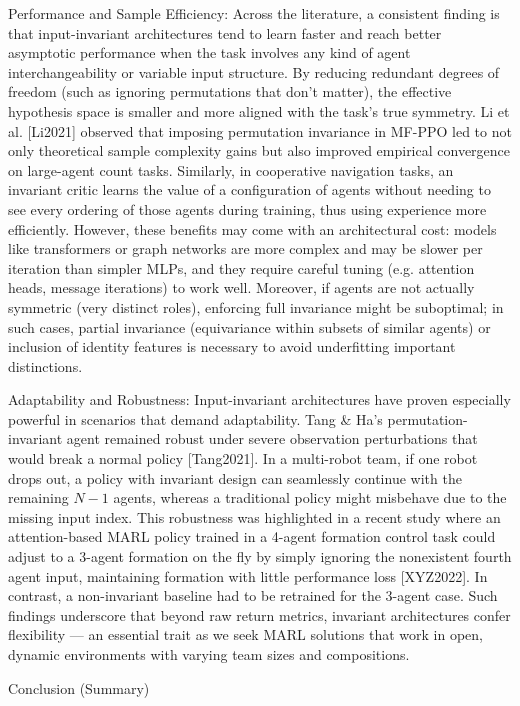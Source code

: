 \documentclass{article}
\begin{document}
Performance and Sample Efficiency: Across the literature, a consistent finding is that input-invariant architectures tend to learn faster and reach better asymptotic performance when the task involves any kind of agent interchangeability or variable input structure. By reducing redundant degrees of freedom (such as ignoring permutations that don’t matter), the effective hypothesis space is smaller and more aligned with the task’s true symmetry. Li et al. [Li2021] observed that imposing permutation invariance in MF-PPO led to not only theoretical sample complexity gains but also improved empirical convergence on large-agent count tasks. Similarly, in cooperative navigation tasks, an invariant critic learns the value of a configuration of agents without needing to see every ordering of those agents during training, thus using experience more efficiently. However, these benefits may come with an architectural cost: models like transformers or graph networks are more complex and may be slower per iteration than simpler MLPs, and they require careful tuning (e.g. attention heads, message iterations) to work well. Moreover, if agents are not actually symmetric (very distinct roles), enforcing full invariance might be suboptimal; in such cases, partial invariance (equivariance within subsets of similar agents) or inclusion of identity features is necessary to avoid underfitting important distinctions.

Adaptability and Robustness: Input-invariant architectures have proven especially powerful in scenarios that demand adaptability. Tang \& Ha's permutation-invariant agent remained robust under severe observation perturbations that would break a normal policy [Tang2021]. In a multi-robot team, if one robot drops out, a policy with invariant design can seamlessly continue with the remaining $N-1$ agents, whereas a traditional policy might misbehave due to the missing input index. This robustness was highlighted in a recent study where an attention-based MARL policy trained in a 4-agent formation control task could adjust to a 3-agent formation on the fly by simply ignoring the nonexistent fourth agent input, maintaining formation with little performance loss [XYZ2022]. In contrast, a non-invariant baseline had to be retrained for the 3-agent case. Such findings underscore that beyond raw return metrics, invariant architectures confer flexibility — an essential trait as we seek MARL solutions that work in open, dynamic environments with varying team sizes and compositions.

Conclusion (Summary)
\end{document}
